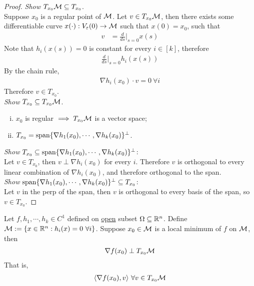 \documentclass{article}
\begin{document}
   	\begin{proof}
   		\emph{Show} $T_{x_0} \mathcal{{M}} \subseteq T_{x_0}$.\\
   		Suppose $x_0$ is a regular point of $\mathcal{{M}}$.
   		Let $v \in T_{x_0} \mathcal{{M}}$, then there exists some differentiable curve $x(\cdot):V_\varepsilon(0) \to \mathcal{{M}}$ such that $x(0) = x_0$, such that
   		\begin{align}
   			v &= \frac{d}{ds} \bigg \vert_{s=0} x(s)
   		\end{align}
   		Note that $h_i(x(s)) = 0$ is constant for every $i \in [k]$, therefore
   		\begin{align}
   			\frac{d}{ds} \bigg \vert_{s=0} h_i(x(s))
   		\end{align}
   		By the chain rule, 
   		\begin{align}
   			\nabla h_i(x_0)\cdot v = 0\ \forall i
   		\end{align}
   		Therefore $v \in T_{x_0}$. \\
   		\emph{Show} $T_{x_0} \subseteq T_{x_0} \mathcal{{M}}$.
   		\begin{enumerate}[(i)]
   			\item $x_0$ is regular $\implies T_{x_0} \mathcal{{M}}$ is a vector space;
   			\item $T_{x_0} = \text{{span}}\{\nabla h_1 (x_0), \cdots, \nabla h_k(x_0)\}^\perp$.
   		\end{enumerate}
   		\emph{Show} $T_{x_0} \subseteq \text{{span}}\{\nabla h_1 (x_0), \cdots, \nabla h_k(x_0)\}^\perp$: \\
   		Let $v \in T_{x_0}$, then $v \perp \nabla h_i(x_0)$ for every $i$. Therefore $v$ is orthogonal to every linear combination of $\nabla h_i(x_0)$, and therefore orthogonal to the span.\\
   		\emph{Show} $\text{{span}}\{\nabla h_1 (x_0), \cdots, \nabla h_k(x_0)\}^\perp \subseteq T_{x_0}$: \\
   		Let $v$ in the perp of the span, then $v$ is orthogonal to every basis of the span, so $v \in T_{x_0}$.
   	\end{proof}
   	
   	\begin{lemma}
   		Let $f, h_1, \cdots, h_k \in C^1$ defined on \ul{open} subset $\Omega \subseteq \mathbb{R}^n$. Define $\mathcal{{M}} := \{x \in \mathbb{R}^n: h_i(x) = 0\ \forall i \}$. Suppose $x_0 \in \mathcal{{M}}$ is a local minimum of $f$ on $\mathcal{{M}}$, then 
   		\begin{align}
   			\nabla f(x_0) \perp T_{x_0} \mathcal{{M}}
   		\end{align}
   		That is,
   		\begin{align}
   			\langle {\nabla f(x_0)}, {v} \rangle \ \forall v \in T_{x_0}\mathcal{{M}}
   		\end{align}
   	\end{lemma}
   	
\end{document}

